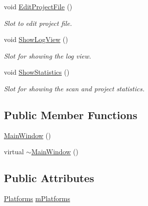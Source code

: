 \begin{DoxyCompactItemize}
void \hyperlink{class_main_window_a9d05a202c12fadbd15da95dd45facb32}{Edit\-Project\-File} ()
\begin{DoxyCompactList}\small\item\em Slot to edit project file. \end{DoxyCompactList}\item 
void \hyperlink{class_main_window_a93661619d9347814e64ebeaf32fba77f}{Show\-Log\-View} ()
\begin{DoxyCompactList}\small\item\em Slot for showing the log view. \end{DoxyCompactList}\item 
void \hyperlink{class_main_window_aa9b20782ed01d86b78d6b995531c06a5}{Show\-Statistics} ()
\begin{DoxyCompactList}\small\item\em Slot for showing the scan and project statistics. \end{DoxyCompactList}\end{DoxyCompactItemize}
\subsection*{Public Member Functions}
\begin{DoxyCompactItemize}
\item 
\hyperlink{class_main_window_a34c4b4207b46d11a4100c9b19f0e81bb}{Main\-Window} ()
\item 
virtual \hyperlink{class_main_window_ae98d00a93bc118200eeef9f9bba1dba7}{$\sim$\-Main\-Window} ()
\end{DoxyCompactItemize}
\subsection*{Public Attributes}
\begin{DoxyCompactItemize}
\item 
\hyperlink{class_platforms}{Platforms} \hyperlink{class_main_window_a8bd97f168e4c804cfe770af7ddf3faf1}{m\-Platforms}
\end{DoxyCompactItemize}
